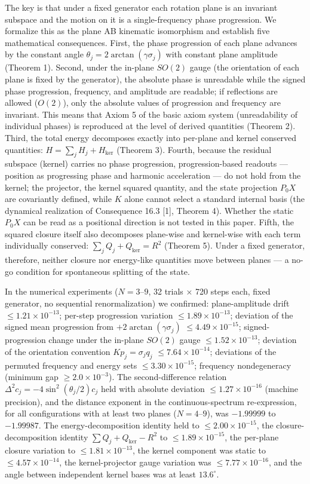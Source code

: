 \documentclass[
  a4paper,
]{article}
\begin{document}
The key is that under a fixed generator each rotation plane is an
invariant subspace and the motion on it is a single-frequency phase
progression. We formalize this as the plane AB kinematic isomorphism and
establish five mathematical consequences. First, the phase progression
of each plane advances by the constant angle
\(\theta_j=2\arctan(\gamma\sigma_j)\) with constant plane amplitude
(Theorem 1). Second, under the in-plane \(SO(2)\) gauge (the orientation
of each plane is fixed by the generator), the absolute phase is
unreadable while the signed phase progression, frequency, and amplitude
are readable; if reflections are allowed (\(O(2)\)), only the absolute
values of progression and frequency are invariant. This means that Axiom
5 of the basic axiom system (unreadability of individual phases) is
reproduced at the level of derived quantities (Theorem 2). Third, the
total energy decomposes exactly into per-plane and kernel conserved
quantities: \(H=\sum_j H_j+H_{\ker}\) (Theorem 3). Fourth, because the
residual subspace (kernel) carries no phase progression,
progression-based readouts --- position as progressing phase and
harmonic acceleration --- do not hold from the kernel; the projector,
the kernel squared quantity, and the state projection \(P_0X\) are
covariantly defined, while \(K\) alone cannot select a standard internal
basis (the dynamical realization of Consequence 16.3 {[}1{]}, Theorem
4). Whether the static \(P_0X\) can be read as a positional direction is
not tested in this paper. Fifth, the squared closure itself also
decomposes plane-wise and kernel-wise with each term individually
conserved: \(\sum_jQ_j+Q_{\ker}=R^2\) (Theorem 5). Under a fixed
generator, therefore, neither closure nor energy-like quantities move
between planes --- a no-go condition for spontaneous splitting of the
state.

In the numerical experiments (\(N=3\)--\(9\), 32 trials × 720 steps
each, fixed generator, no sequential renormalization) we confirmed:
plane-amplitude drift \(\le1.21\times10^{-13}\); per-step progression
variation \(\le1.89\times10^{-13}\); deviation of the signed mean
progression from \(+2\arctan(\gamma\sigma_j)\)
\(\le4.49\times10^{-15}\); signed-progression change under the in-plane
\(SO(2)\) gauge \(\le1.52\times10^{-13}\); deviation of the orientation
convention \(Kp_j=\sigma_jq_j\) \(\le7.64\times10^{-14}\); deviations of
the permuted frequency and energy sets \(\le3.30\times10^{-15}\);
frequency nondegeneracy (minimum gap \(\ge2.0\times10^{-3}\)). The
second-difference relation \(\Delta^2c_j=-4\sin^2(\theta_j/2)c_j\) held
with absolute deviation \(\le1.27\times10^{-16}\) (machine precision),
and the distance exponent in the continuous-spectrum re-expression, for
all configurations with at least two planes (\(N=4\)--\(9\)), was
\(-1.99999\) to \(-1.99987\). The energy-decomposition identity held to
\(\le2.00\times10^{-15}\), the closure-decomposition identity
\(\sum Q_j+Q_{\ker}-R^2\) to \(\le1.89\times10^{-15}\), the per-plane
closure variation to \(\le1.81\times10^{-13}\), the kernel component was
static to \(\le4.57\times10^{-14}\), the kernel-projector gauge
variation was \(\le7.77\times10^{-16}\), and the angle between
independent kernel bases was at least \(13.6^\circ\).
\end{document}
